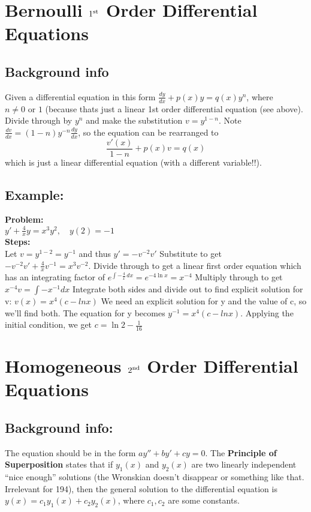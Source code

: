 \documentclass{article}
\begin{document}
\hypertarget{bernoulliSolve}{
  \section*{Bernoulli $1^{ \rm st}$ Order Differential Equations}
  \subsection*{Background info} 
  Given a differential equation in this form $\frac{dy}{dx} + p(x)y=q(x)y^n$, where $n \ne 0 \text{ or } 1$ (because thats just a linear 1st order differential equation (see above). Divide through by $y^n$ and make the substitution $v=y^{1-n}$. Note $\frac{dv}{dx} = (1-n)y^{-n}\frac{dy}{dx}$, so the equation can be rearranged to 
\begin{equation*}
\frac{v'(x)}{1-n} + p(x)v=q(x)
\end{equation*}
which is just a linear differential equation (with a different variable!!).
  \subsection*{Example:}
  \textbf{Problem:}\\[6pt]
  $y' + \frac{4}{x} y = x^3 y^2, \quad y(2) = -1$\\[6pt]
  \textbf{Steps:}\\[6pt]
   Let $v = y^{1 - 2} = y^{-1}$ and thus $y' = -v^{-2} v'$\newline
   Substitute to get $-v^{-2} v' + \frac{4}{x} v^{-1} = x^3 v^{-2}.$\newline
   Divide through to get a linear first order equation which has an integrating factor of $e^{\int -\frac{4}{x} \, dx} = e^{-4 \ln x} = x^{-4}$
	Multiply through to get $x^{-4}v =\int{-x^{-1}dx}$\newline
	Integrate both sides and divide out to find explicit solution for v: $v(x) = x^4(c-lnx)$ \newline
	We need an explicit solution for y and the value of c, so we'll find both. The equation for y becomes $y^{-1} = x^4(c-lnx)$. Applying the initial condition, we get $c= \ln 2 - \frac{1}{16}$
}
\hypertarget{homogeneousSolve}{
  \section*{Homogeneous $2^{\text{\rm nd}}$ Order Differential Equations}
  \subsection*{Background info:} 
  The equation should be in the form $ay'' + by' + cy = 0$.\newline 
  The \textbf{Principle of Superposition} states that if $y_1(x)$ and $y_2(x)$ are two linearly independent ``nice enough'' solutions (the Wronskian doesn't disappear or something like that. Irrelevant for 194), then the general solution to the differential equation is $y(x) = c_1y_1(x) + c_2y_2(x)$, where $c_1, c_2$ are some constants.\newline
}
\end{document}
